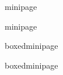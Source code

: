 \documentclass[ aspectratio=149,  10pt,blue,xcolor=pdftex,dvipsnames,table,handout,notes]{beamer}
\begin{document}
		\begin{frame}[t]{minipage}


			\begin{block} {minipage}
			\end{block}

		\note[item]{}
		\end{frame}





		
		\begin{frame}[t]{boxedminipage}

			\begin{block} {boxedminipage}
			\end{block}

			\begin{example}
			\end{example}


		\note[item]{}
		\end{frame}
\end{document}
